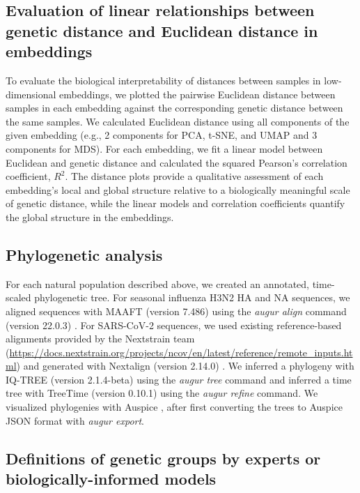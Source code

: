 \documentclass[10pt,letterpaper]{article}
\begin{document}
\subsection*{Evaluation of linear relationships between genetic distance and Euclidean distance in embeddings}

To evaluate the biological interpretability of distances between samples in low-dimensional embeddings, we plotted the pairwise Euclidean distance between samples in each embedding against the corresponding genetic distance between the same samples.
We calculated Euclidean distance using all components of the given embedding (e.g., 2 components for PCA, t-SNE, and UMAP and 3 components for MDS).
For each embedding, we fit a linear model between Euclidean and genetic distance and calculated the squared Pearson's correlation coefficient, $R^{2}$.
The distance plots provide a qualitative assessment of each embedding's local and global structure relative to a biologically meaningful scale of genetic distance, while the linear models and correlation coefficients quantify the global structure in the embeddings.

\subsection*{Phylogenetic analysis}

For each natural population described above, we created an annotated, time-scaled phylogenetic tree.
For seasonal influenza H3N2 HA and NA sequences, we aligned sequences with MAAFT (version 7.486) \cite{Katoh2002,Katoh2013} using the \textit{augur align} command (version 22.0.3) \cite{Huddleston2021}.
For SARS-CoV-2 sequences, we used existing reference-based alignments provided by the Nextstrain team (\href{https://docs.nextstrain.org/projects/ncov/en/latest/reference/remote_inputs.html#summary-of-available-genbank-open-files}{https://docs.nextstrain.org/projects/ncov/en/latest/reference/remote\_inputs.html}) and generated with Nextalign (version 2.14.0) \cite{Aksamentov2021}.
We inferred a phylogeny with IQ-TREE (version 2.1.4-beta) \cite{Nguyen2014} using the \textit{augur tree} command and inferred a time tree with TreeTime (version 0.10.1) \cite{Sagulenko2018} using the \textit{augur refine} command.
We visualized phylogenies with Auspice \cite{Hadfield2018}, after first converting the trees to Auspice JSON format with \textit{augur export}.

\subsection*{Definitions of genetic groups by experts or biologically-informed models}
\end{document}
